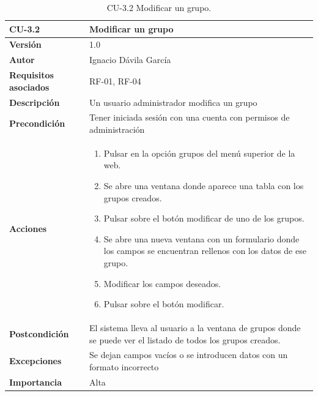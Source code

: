 \begin{table}[p]
	\centering
	\begin{tabularx}{\linewidth}{ p{} p{} }
		\toprule
		\textbf{CU-3.2}    & \textbf{Modificar un grupo}\\
		\toprule
		\textbf{Versión}              & 1.0    \\
		\textbf{Autor}                & Ignacio Dávila García \\
		\textbf{Requisitos asociados} & RF-01, RF-04 \\
		\textbf{Descripción}          & Un usuario administrador modifica un grupo \\
		\textbf{Precondición}         & Tener iniciada sesión con una cuenta con permisos de administración \\
		\textbf{Acciones}             &
		\begin{enumerate}
			\def\labelenumi{\arabic{enumi}.}
			\tightlist
			\item Pulsar en la opción grupos del menú superior de la web.
			\item Se abre una ventana donde aparece una tabla con los grupos creados.
			\item Pulsar sobre el botón modificar de uno de los grupos.
			\item Se abre una nueva ventana con un formulario donde los campos se encuentran rellenos con los datos de ese grupo.
			\item Modificar los campos deseados.
			\item Pulsar sobre el botón modificar.
		\end{enumerate}\\
		\textbf{Postcondición}        & El sistema lleva al usuario a la ventana de grupos donde se puede ver el listado de todos los grupos creados. \\
		\textbf{Excepciones}          & Se dejan campos vacíos o se introducen datos con un formato incorrecto \\
		\textbf{Importancia}          & Alta \\
		\bottomrule
	\end{tabularx}
	\caption{CU-3.2 Modificar un grupo.}
\end{table}

